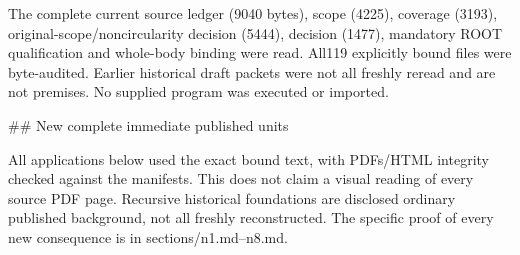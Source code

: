 \documentclass[11pt]{article}
\begin{document}
\begin{ReviewBody}
The complete current source ledger (9040 bytes), scope (4225), coverage (3193), original-scope/noncircularity decision (5444), decision (1477), mandatory ROOT qualification and whole-body binding were read. All119 explicitly bound files were byte-audited. Earlier historical draft packets were not all freshly reread and are not premises. No supplied program was executed or imported.

## New complete immediate published units

All applications below used the exact bound text, with PDFs/HTML integrity checked against the manifests. This does not claim a visual reading of every source PDF page. Recursive historical foundations are disclosed ordinary published background, not all freshly reconstructed. The specific proof of every new consequence is in sections/n1.md--n8.md.


\end{ReviewBody}
\end{document}
